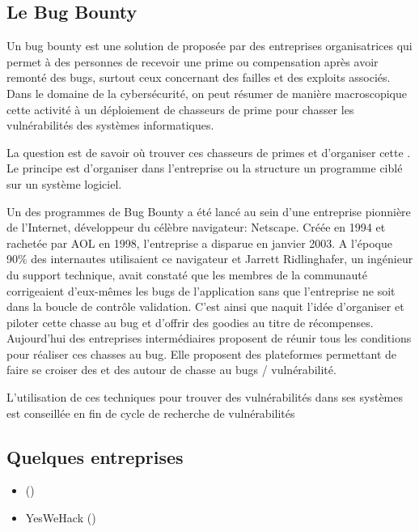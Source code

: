 
\subsection{Le Bug Bounty}

Un bug bounty est une solution de  proposée par des entreprises organisatrices qui permet à des personnes de recevoir une prime ou compensation après avoir remonté des bugs, surtout ceux concernant des failles et des exploits associés. Dans le domaine de la cybersécurité, on peut résumer de manière macroscopique cette activité  à un déploiement de chasseurs de prime pour chasser les vulnérabilités  des systèmes informatiques.

La question est de savoir où trouver ces chasseurs de primes et d'organiser cette . Le principe est d'organiser dans l'entreprise ou la structure un programme ciblé sur un système logiciel.

Un des programmes de Bug Bounty  a été lancé au sein d’une entreprise pionnière de l'Internet, développeur du célèbre navigateur: Netscape. Créée en 1994 et rachetée par AOL en 1998, l’entreprise a disparue en janvier 2003.
A l'époque 90\% des internautes utilisaient ce navigateur et Jarrett Ridlinghafer, un ingénieur du support technique, avait constaté que les membres de la communauté  corrigeaient d’eux-mêmes les bugs de l'application sans que l'entreprise ne soit dans la boucle de contrôle validation. C'est ainsi que naquit l'idée d'organiser et piloter cette chasse au bug et d'offrir des goodies au titre de récompenses. 
Aujourd'hui des entreprises intermédiaires proposent de réunir tous les conditions pour réaliser ces chasses au bug.
Elle proposent des plateformes permettant de faire se croiser des  et des  autour de chasse au bugs / vulnérabilité.

L'utilisation de ces techniques pour trouver des vulnérabilités dans ses systèmes est conseillée en fin de cycle de recherche de vulnérabilités

\subsection{Quelques entreprises}

\begin{itemize}
    \item  ()
    \item YesWeHack ()
\end{itemize}


